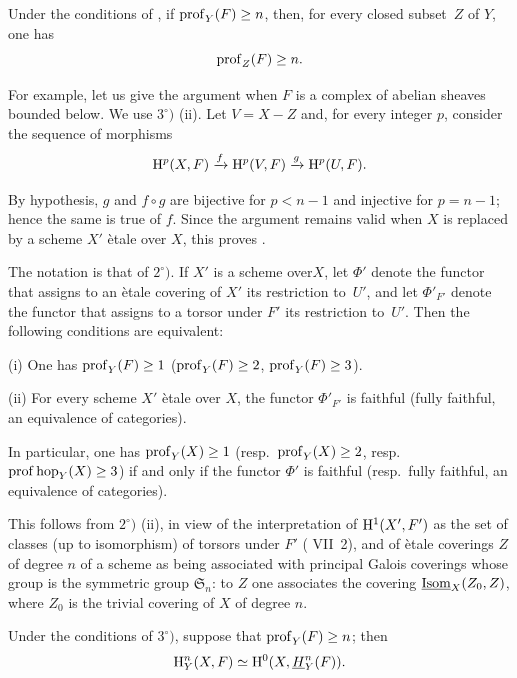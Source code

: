 \begin{corollaire} \label{XIV.1.3}
Under the conditions of , if $\operatorname{prof}_Y(F)\geq n$, then, for every closed subset~$Z$ of $Y$, one has
$$
\operatorname{prof}_Z(F)\geq n.
$$
\end{corollaire}

For example, let us give the argument when $F$ is a complex of abelian sheaves bounded below. We use  $3^\circ)$ \textup{(ii)}. Let $V=X-Z$ and, for every integer $p$, consider the sequence of morphisms
$$
\mathrm H^p(X, F)\xrightarrow{f} \mathrm H^p(V, F)\xrightarrow{g} \mathrm H^p(U, F).
$$

By hypothesis, $g$ and $f\circ g$ are bijective for $p<n-1$ and injective for $p=n-1$; hence the same is true of $f$. Since the argument remains valid when $X$ is replaced by a scheme $X'$ \`etale over $X$, this proves .

\begin{corollaire} \label{XIV.1.4} The notation is that of  $2^\circ)$. If $X'$ is a scheme over\pageoriginale $X$, let $\Phi'$ denote the functor that assigns to an \`etale covering of $X'$ its restriction to~$U'$, and let $\Phi'_{F'}$ denote the functor that assigns to a torsor under $F'$ its restriction to~$U'$. Then the following conditions are equivalent:

\textup{(i)} One has $\operatorname{prof}_Y(F)\geq 1$ (\resp $\operatorname{prof}_Y(F)\geq 2$, \resp $\operatorname{prof}_Y(F)\geq 3$).

\textup{(ii)} For every scheme $X'$ \`etale over $X$, the functor $\Phi'_{F'}$ is faithful (\resp fully faithful, \resp an equivalence of categories).

In particular, one has $\operatorname{prof}_Y({X})\geq 1$ (resp.\ $\operatorname{prof}_Y({X})\geq 2$, resp.\ $\operatorname{prof} \operatorname{hop}_Y(X)\geq 3$) if and only if the functor $\Phi'$ is faithful (resp.\ fully faithful, \resp an equivalence of categories).
\end{corollaire}

This follows from  $2^\circ)$ \textup{(ii)}, in view of the interpretation of $\mathrm H^1(X', F')$ as the set of classes (up to isomorphism) of torsors under $F'$ ( VII~2), and of \`etale coverings $Z$ of degree $n$ of a scheme as being associated with principal Galois coverings whose group is the symmetric group $\mathfrak{S}_n$: to $Z$ one associates the covering $\underline{\textup{Isom}}_X(Z_0, Z)$, where $Z_0$ is the trivial covering of $X$ of degree $n$.

\begin{corollaire} \label{XIV.1.5} Under the conditions of  $3^\circ)$, suppose that $\operatorname{prof}_Y(F)\geq n$; then
$$
\mathrm H_Y^n(X, F)\simeq \mathrm H^0(X, {\mathop{\underline{H}}\nolimits}_Y^n(F)).
$$
\end{corollaire}

